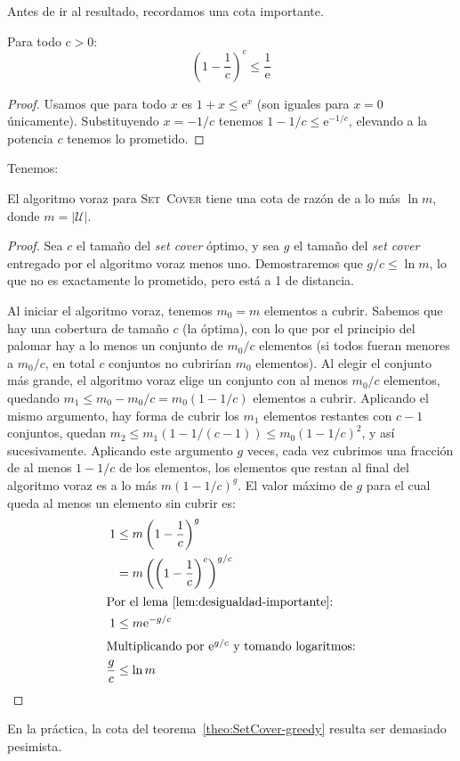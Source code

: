   Antes de ir al resultado,
  recordamos una cota importante.
  \begin{lemma}
    \label{lem:desigualdad-importante}
    Para todo \(c > 0\):
    \begin{equation*}
      \left( 1 - \frac{1}{c} \right)^c
        \le \frac{1}{\mathrm{e}}
    \end{equation*}
  \end{lemma}
  \begin{proof}
    Usamos que para todo \(x\) es \(1 + x \le \mathrm{e}^x\)
    (son iguales para \(x = 0\) únicamente).
    Substituyendo \(x = - 1 / c\) tenemos \(1 - 1/c \le \mathrm{e}^{-1/c}\),
    elevando a la potencia \(c\) tenemos lo prometido.
  \end{proof}
  Tenemos:
  \begin{theorem}
    \label{theo:SetCover-greedy}
    El algoritmo voraz para \textsc{Set~Cover} tiene una cota de razón
    de a lo más \(\ln m\),
    donde \(m = \lvert \mathscr{U} \rvert\).
  \end{theorem}
  \begin{proof}
    Sea \(c\) el tamaño del \emph{\foreignlanguage{english}{set cover}} óptimo,
    y sea \(g\) el tamaño del \emph{\foreignlanguage{english}{set cover}}
    entregado por el algoritmo voraz menos uno.
    Demostraremos que \(g/c \le \ln m\),
    lo que no es exactamente lo prometido,
    pero está a \num{1} de distancia.

    Al iniciar el algoritmo voraz,
    tenemos \(m_0 = m\) elementos a cubrir.
    Sabemos que hay una cobertura de tamaño \(c\)
    (la óptima),
    con lo que por el principio del palomar
    hay a lo menos un conjunto de \(m_0 / c\) elementos
    (si todos fueran menores a \(m_0 / c\),
     en total \(c\) conjuntos no cubrirían \(m_0\) elementos).
    Al elegir el conjunto más grande,
    el algoritmo voraz elige un conjunto con al menos \(m_0 / c\) elementos,
    quedando \(m_1 \le m_0 - m_0 / c = m_0( 1 - 1/c)\) elementos a cubrir.
    Aplicando el mismo argumento,
    hay forma de cubrir los \(m_1\) elementos restantes
    con \(c - 1\) conjuntos,
    quedan \(m_2 \le m_1 (1 - 1 / (c - 1)) \le m_0 (1 - 1 / c)^2\),
    y así sucesivamente.
    Aplicando este argumento \(g\) veces,
    cada vez cubrimos una fracción de al menos \(1 - 1/c\) de los elementos,
    los elementos que restan al final del algoritmo voraz es a lo más
    \(m (1 - 1/c)^g\).
    El valor máximo de \(g\)
    para el cual queda al menos un elemento sin cubrir es:
    \begin{align*}
      1
        &\le m \left( 1 - \frac{1}{c} \right)^g \\
        &=   m \left( \left( 1 - \frac{1}{c} \right)^c \right)^{g/c} \\
    \intertext{Por el lema~\ref{lem:desigualdad-importante}:}
      1
        &\le m \mathrm{e}^{-g/c} \\
    \intertext{Multiplicando por \(\mathrm{e}^{g/c}\) y tomando logaritmos:}
      \frac{g}{c}
        &\le \ln m
    \end{align*}
    \qedhere
  \end{proof}
  En la práctica,
  la cota del teorema~\ref{theo:SetCover-greedy}
  resulta ser demasiado pesimista.

